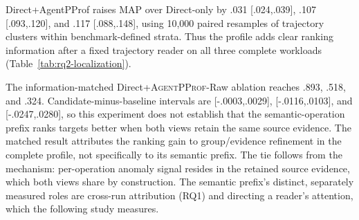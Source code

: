 \documentclass[letterpaper]{article}
\newcommand{\sys}{\textsc{AgentPProf}\xspace}
\begin{document}
Direct+AgentPProf raises MAP over Direct-only by .031 [.024,.039], .107
[.093,.120], and .117 [.088,.148], using 10{,}000 paired resamples of
trajectory clusters within benchmark-defined strata. Thus the profile adds
clear ranking information after a fixed trajectory reader on all three
complete workloads (Table~\ref{tab:rq2-localization}).

The information-matched Direct+\sys-Raw ablation reaches .893, .518, and .324.
Candidate-minus-baseline intervals are [-.0003,.0029], [-.0116,.0103], and
[-.0247,.0280], so this experiment does not establish that the
semantic-operation prefix ranks targets better when both views retain the same
source evidence. The matched result attributes the ranking gain to
group/evidence refinement in the complete profile, not specifically to its
semantic prefix. The tie follows from the mechanism: per-operation
anomaly signal resides in the retained source evidence, which both views share
by construction.
The semantic prefix's distinct, separately measured roles are cross-run
attribution (RQ1) and directing a reader's attention, which the following
study measures.
\end{document}
